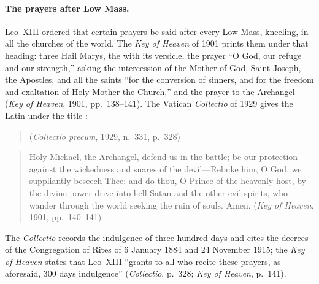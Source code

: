 \paragraph{The prayers after Low Mass.} Leo~XIII ordered that certain
prayers be said after every Low Mass, kneeling, in all the churches of the
world. The \emph{Key of Heaven} of 1901 prints them under that heading:
three Hail Marys, the  with its versicle, the prayer
``O God, our refuge and our strength,'' asking the intercession of the
Mother of God, Saint Joseph, the Apostles, and all the saints ``for the
conversion of sinners, and for the freedom and exaltation of Holy Mother
the Church,'' and the prayer to the Archangel (\emph{Key of Heaven}, 1901,
pp.~138--141). The Vatican \emph{Collectio} of 1929 gives the Latin under
the title :
\begin{quote}
 (\emph{Collectio precum}, 1929,
n.~331, p.~328)
\end{quote}
\begin{quote}
Holy Michael, the Archangel, defend us in the battle; be our protection
against the wickedness and snares of the devil---Rebuke him, O God, we
suppliantly beseech Thee: and do thou, O Prince of the heavenly host, by
the divine power drive into hell Satan and the other evil spirits, who
wander through the world seeking the ruin of souls. Amen. (\emph{Key of
Heaven}, 1901, pp.~140--141)
\end{quote}
The \emph{Collectio} records the indulgence of three hundred days and
cites the decrees of the Congregation of Rites of 6 January 1884 and 24
November 1915; the \emph{Key of Heaven} states that Leo~XIII ``grants to
all who recite these prayers, as aforesaid, 300 days indulgence''
(\emph{Collectio}, p.~328; \emph{Key of Heaven}, p.~141).

